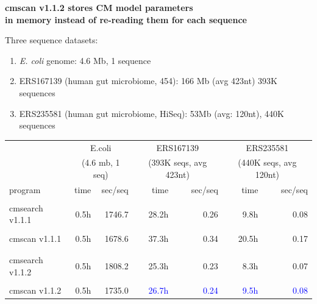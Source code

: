 \documentclass[landscape]{slides}
\begin{document}
\begin{slide}
\begin{center}
\textbf{cmscan v1.1.2 stores CM model parameters \\ in memory instead of re-reading them for each sequence}
\end{center}
\medskip

\small

Three sequence datasets:
\begin{enumerate}
  \item \emph{E. coli} genome: 4.6 Mb, 1 sequence
  \item ERS167139 (human gut microbiome, 454): 166 Mb (avg 423nt) 393K sequences 
  \item ERS235581 (human gut microbiome, HiSeq): 53Mb (avg: 120nt), 440K sequences
\end{enumerate}

\begin{center}

\medskip
\medskip

\begin{tabular}{l|r|r||r|r||r|r||}
         & \multicolumn{2}{c||}{E.coli}  & \multicolumn{2}{c||}{ERS167139} & \multicolumn{2}{c||}{ERS235581} \\
         & \multicolumn{2}{c||}{(4.6 mb, 1 seq)}  & \multicolumn{2}{c||}{(393K seqs, avg 423nt)} & \multicolumn{2}{c||}{(440K seqs, avg 120nt)} \\ \hline
program  & time & sec/seq & time & sec/seq & time & sec/seq \\ \hline
         &      &  & & & & \\
cmsearch v1.1.1  &     0.5h& 1746.7  & 28.2h   & 0.26    & 9.8h    & 0.08 \\
         &      &  & & & & \\
cmscan v1.1.1   &     0.5h& 1678.6  & 37.3h   & 0.34    & 20.5h   & 0.17 \\
         &      &  & & & & \\ \hline
         &      &  & & & & \\ 
cmsearch v1.1.2  &     0.5h& 1808.2  & 25.3h   & 0.23    & 8.3h    & 0.07 \\
         &      &  & & & & \\
cmscan v1.1.2   &     0.5h& 1735.0  & \textcolor{blue}{26.7h}   & \textcolor{blue}{0.24}    & \textcolor{blue}{9.5h}   & \textcolor{blue}{0.08} \\
\end{tabular}

\end{center}
\vfill
\end{slide}
\end{document}
